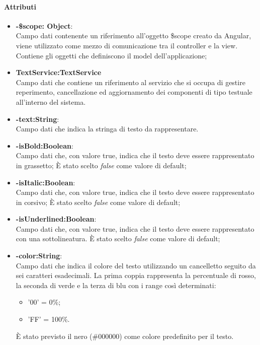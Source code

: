 	\paragraph{Attributi}
	\begin{itemize}
		\item \textbf{-\$scope: Object}:\\
			Campo dati contenente un riferimento all'oggetto \$scope creato da Angular, viene utilizzato come mezzo di comunicazione tra il controller e la view. Contiene gli oggetti che definiscono il model dell'applicazione;
		\item  \textbf{TextService:TextService}\\
			Campo dati che contiene un riferimento al servizio che si occupa di gestire reperimento, cancellazione ed aggiornamento dei componenti di tipo testuale all'interno del sistema.
		\item\textbf{-text:String}:\\
			Campo dati che indica la stringa di testo da rappresentare.
		\item\textbf{-isBold:Boolean}:\\
			Campo dati che, con valore true, indica che il testo deve essere rappresentato in grassetto; È stato scelto \textit{false} come valore di default; 
		\item\textbf{-isItalic:Boolean}:\\
			Campo dati che, con valore true, indica che il testo deve essere rappresentato in corsivo; È stato scelto \textit{false} come valore di default;
		\item\textbf{-isUnderlined:Boolean}:\\
			Campo dati che, con valore true, indica che il testo deve essere rappresentato con una sottolineatura. È stato scelto \textit{false} come valore di default;
		\item\textbf{-color:String}:\\
			Campo dati che indica il colore del testo utilizzando un cancelletto seguito da sei caratteri esadecimali. La prima coppia rappresenta la percentuale di rosso, la seconda di verde e la terza di blu con i range così determinati:
			\begin{itemize}
				\item '00' = 0\%;
				\item 'FF' = 100\%.
			\end{itemize}
			È stato previsto il nero (\#000000) come colore predefinito per il testo. 
				
											
	\end{itemize}
	
